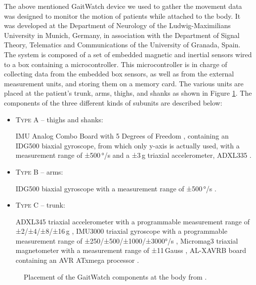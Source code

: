 The above mentioned GaitWatch device we used to gather the movement data was designed to monitor the motion of patients while attached to the body. It was developed at the Department of Neurology of the Ludwig-Maximilians University in Munich, Germany, in association with the Department of Signal Theory, Telematics and Communications of the University of Granada, Spain. The system is composed of a set of embedded magnetic and inertial sensors wired to a box containing a microcontroller. This microcontroller is in charge of collecting data from the embedded box sensors, as well as from the external measurement units, and storing them on a memory card. The various units are placed at the patient's trunk, arms, thighs, and shanks as shown in Figure \ref{fig:GaitWatch_placement}. The components of the three different kinds of subunits are described below:


\begin{itemize}

\item \textsc{Type A} -- thighs and shanks: 

IMU Analog Combo Board with 5 Degrees of Freedom \cite{IMU5}, containing an IDG500 biaxial gyroscope, from which only y-axis is actually used, with a measurement range of ±500\,°/s \cite{IDG500} and a ±3\,g triaxial accelerometer, ADXL335 \cite{ADXL335}.

\item \textsc{Type B} -- arms:

IDG500 biaxial gyroscope with a measurement range of ±500\,°/s \cite{IDG500}.

\item \textsc{Type C} -- trunk:

ADXL345 triaxial accelerometer with a programmable measurement range of ±2/±4/±8/±16\,g \cite{ADXL345},
IMU3000 triaxial gyroscope with a programmable measurement range of ±250/±500/±1000/±3000°/s \cite{IMU3000}, 
Micromag3 \allowbreak triaxial magnetometer with a measurement range of ±11\,Gauss \cite{MicroMag3}, AL-XAVRB board containing an AVR ATxmega processor \cite{AVRATxmega}.

\end{itemize}

\begin{figure}
	\centering
	\caption{Placement of the GaitWatch components at the body from \cite{olivares_vicente_gaitwatch_2013}.}
	\label{fig:GaitWatch_placement}
\end{figure}
